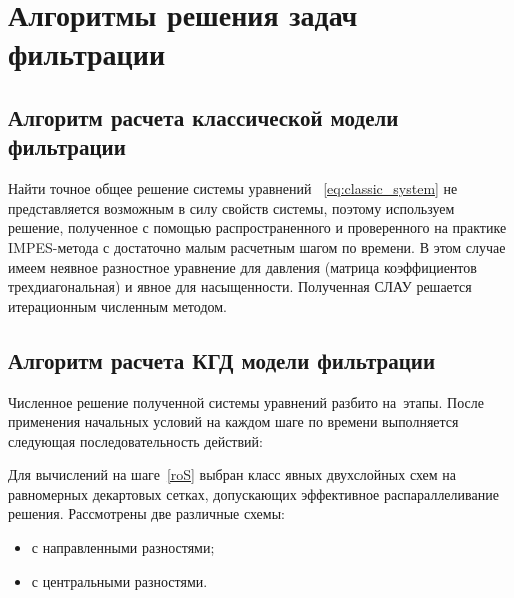 \chapter{Алгоритмы решения задач фильтрации} \label{ch:ch2}

\section{Алгоритм расчета классической модели фильтрации} \label{sec:ch2/sec1}

Найти точное общее решение системы уравнений ~\eqref{eq:classic_system} не представляется возможным в силу свойств системы, поэтому используем решение, полученное с помощью распространенного и проверенного на практике IMPES-метода с достаточно малым расчетным шагом по времени.
В этом случае имеем неявное разностное уравнение для давления (матрица коэффициентов трехдиагональная) и явное для насыщенности. Полученная СЛАУ решается итерационным численным методом.

\section{Алгоритм расчета КГД модели фильтрации} \label{sec:ch2/sec2}

Численное решение полученной системы уравнений разбито на~этапы. После
применения начальных условий на каждом шаге по времени выполняется следующая
последовательность действий: 
Для вычислений на шаге~\ref{roS} выбран класс явных двухслойных схем на равномерных декартовых сетках,
допускающих эффективное распараллеливание решения.
Рассмотрены две различные схемы:
\begin{itemize}
\item с направленными разностями;
\item с центральными разностями.
\end{itemize}

